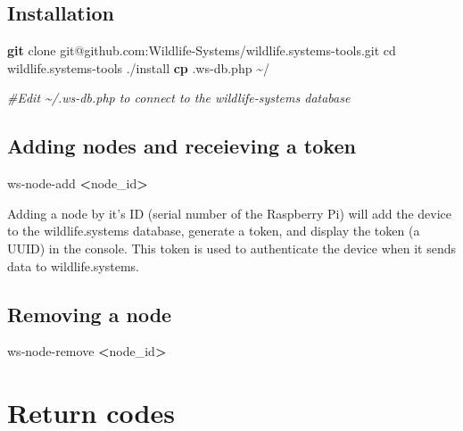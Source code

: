 \documentclass[
]{book}
\newenvironment{Shaded}{\begin{snugshade}}{\end{snugshade}}
\newcommand{\BuiltInTok}[1]{#1}
\newcommand{\CommentTok}[1]{\textcolor[rgb]{0.56,0.35,0.01}{\textit{#1}}}
\newcommand{\ExtensionTok}[1]{#1}
\newcommand{\FunctionTok}[1]{\textcolor[rgb]{0.13,0.29,0.53}{\textbf{#1}}}
\newcommand{\NormalTok}[1]{#1}
\newcommand{\OperatorTok}[1]{\textcolor[rgb]{0.81,0.36,0.00}{\textbf{#1}}}
\begin{document}
\section{Installation}\label{installation}

\begin{Shaded}
\begin{Highlighting}[]
\FunctionTok{git}\NormalTok{ clone git@github.com:Wildlife{-}Systems/wildlife.systems{-}tools.git}
\BuiltInTok{cd}\NormalTok{ wildlife.systems{-}tools}
\ExtensionTok{./install}
\FunctionTok{cp}\NormalTok{ .ws{-}db.php \textasciitilde{}/}

\CommentTok{\#Edit \textasciitilde{}/.ws{-}db.php to connect to the wildlife{-}systems database}
\end{Highlighting}
\end{Shaded}

\section{Adding nodes and receieving a token}\label{adding-nodes-and-receieving-a-token}

\begin{Shaded}
\begin{Highlighting}[]
\ExtensionTok{ws{-}node{-}add} \OperatorTok{\textless{}}\NormalTok{node\_id}\OperatorTok{\textgreater{}}
\end{Highlighting}
\end{Shaded}

Adding a node by it's ID (serial number of the Raspberry Pi) will add the device to the wildlife.systems database, generate a token, and display the token (a UUID) in the console. This token is used to authenticate the device when it sends data to wildlife.systems.

\section{Removing a node}\label{removing-a-node}

\begin{Shaded}
\begin{Highlighting}[]
\ExtensionTok{ws{-}node{-}remove} \OperatorTok{\textless{}}\NormalTok{node\_id}\OperatorTok{\textgreater{}}
\end{Highlighting}
\end{Shaded}

\appendix


\chapter{Return codes}\label{return-codes}
\end{document}
